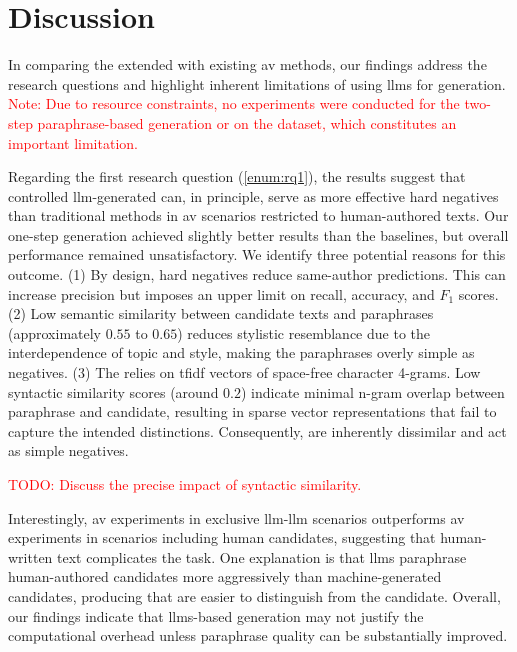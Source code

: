 \chapter{Discussion}
\label{chap:discussion}
In comparing the extended \impAppr{} with existing \ac{av} methods, our findings address the research questions and highlight inherent limitations of using \acp{llm} for \imp{} generation. 
\textcolor{red}{Note: Due to resource constraints, no experiments were conducted for the two-step paraphrase-based \imp{} generation or on the \dataPan{} dataset, which constitutes an important limitation.}

Regarding the first research question (\autoref{enum:rq1}), the results suggest that controlled \ac{llm}-generated \imps{} can, in principle, serve as more effective hard negatives than traditional methods in \ac{av} scenarios restricted to human-authored texts. 
Our one-step \imp{} generation achieved slightly better results than the baselines, but overall performance remained unsatisfactory. 
We identify three potential reasons for this outcome.
(1) By design, hard negatives reduce same-author predictions. 
This can increase precision but imposes an upper limit on recall, accuracy, and $F_1$ scores. 
(2) Low semantic similarity between candidate texts and paraphrases (approximately $0.55$ to $0.65$) reduces stylistic resemblance due to the interdependence of topic and style, making the paraphrases overly simple as negatives. 
(3) The \impAppr{} relies on \ac{tfidf} vectors of space-free character 4-grams. 
Low syntactic similarity scores (around $0.2$) indicate minimal n-gram overlap between paraphrase and candidate, resulting in sparse vector representations that fail to capture the intended distinctions.
Consequently, \imps{} are inherently dissimilar and act as simple negatives. 

\textcolor{red}{TODO: Discuss the precise impact of syntactic similarity.}

Interestingly, \ac{av} experiments in exclusive \ac{llm}-\ac{llm} scenarios outperforms \ac{av} experiments in scenarios including human candidates, suggesting that human-written text complicates the task. 
One explanation is that \acp{llm} paraphrase human-authored candidates more aggressively than machine-generated candidates, producing \imps{} that are easier to distinguish from the candidate. 
Overall, our findings indicate that \acp{llm}-based \imp{} generation may not justify the computational overhead unless paraphrase quality can be substantially improved.

